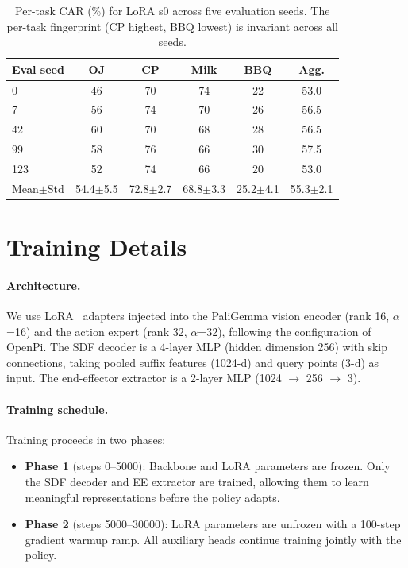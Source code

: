 \begin{table}[h]
\centering
\caption{Per-task CAR (\%) for LoRA s0 across five evaluation seeds. The per-task fingerprint (CP highest, BBQ lowest) is invariant across all seeds.}
\label{tab:eval_seed_car_detail}
\vspace{2pt}
\small
\begin{tabular}{lccccc}
\toprule
Eval seed & OJ & CP & Milk & BBQ & Agg. \\
\midrule
0   & 46 & 70 & 74 & 22 & 53.0 \\
7   & 56 & 74 & 70 & 26 & 56.5 \\
42  & 60 & 70 & 68 & 28 & 56.5 \\
99  & 58 & 76 & 66 & 30 & 57.5 \\
123 & 52 & 74 & 66 & 20 & 53.0 \\
\midrule
Mean$\pm$Std & 54.4$\pm$5.5 & 72.8$\pm$2.7 & 68.8$\pm$3.3 & 25.2$\pm$4.1 & 55.3$\pm$2.1 \\
\bottomrule
\end{tabular}
\end{table}


\section{Training Details}
\label{sec:appendix_training}

\paragraph{Architecture.}
We use LoRA~\citep{hu2022lora} adapters injected into the PaliGemma vision encoder (rank 16, $\alpha$=16) and the action expert (rank 32, $\alpha$=32), following the configuration of OpenPi. The SDF decoder is a 4-layer MLP (hidden dimension 256) with skip connections, taking pooled suffix features (1024-d) and query points (3-d) as input. The end-effector extractor is a 2-layer MLP (1024 $\to$ 256 $\to$ 3).

\paragraph{Training schedule.}
Training proceeds in two phases:
\begin{itemize}
    \item \textbf{Phase 1} (steps 0--5000): Backbone and LoRA parameters are frozen. Only the SDF decoder and EE extractor are trained, allowing them to learn meaningful representations before the policy adapts.
    \item \textbf{Phase 2} (steps 5000--30000): LoRA parameters are unfrozen with a 100-step gradient warmup ramp. All auxiliary heads continue training jointly with the policy.
\end{itemize}

